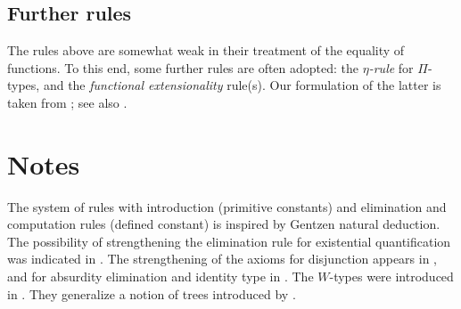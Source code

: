 \subsection{Further rules} \label{subsec:optional-rules}

The rules above are somewhat weak in their treatment of the equality of functions.  To this end, some further rules are often adopted: the \emph{$\eta$-rule} for $\Pi$-types, and the \emph{functional extensionality} rule(s).  Our formulation of the latter is taken from \cite{garner:depprod}; see also \cite{hofmann:thesis}.


\egroup

\section{Notes}\label{subsec:general-remarks}


  The system of rules with introduction (primitive constants) and elimination
  and computation rules (defined constant) is inspired by Gentzen natural
  deduction. The possibility of strengthening the elimination rule for
  existential quantification was indicated in \cite{Howard-1969}. The
  strengthening of the axioms for disjunction appears in \cite{Martin-Lof-1972},
  and for absurdity elimination and identity type in \cite{Martin-Lof-1973}. The
  $W$-types were introduced in \cite{Martin-Lof-1979}. They generalize a notion
  of trees introduced by \cite{Tait-1968}.

